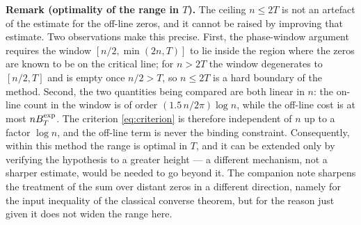 \documentclass[11pt]{article}
\theoremstyle{remark}
\begin{document}
\medskip
\noindent\textbf{Remark (optimality of the range in $T$).}\label{rem:optimal}
The ceiling $n\le 2T$ is not an artefact of the estimate for the off-line zeros, and it cannot be
raised by improving that estimate. Two observations make this precise. First, the phase-window
argument requires the window $[n/2,\min(2n,T)]$ to lie inside the region where the zeros are known
to be on the critical line; for $n>2T$ the window degenerates to $[n/2,T]$ and is empty once
$n/2>T$, so $n\le2T$ is a hard boundary of the method. Second, the two quantities being compared
are both linear in $n$: the on-line count in the window is of order $(1.5\,n/2\pi)\log n$, while the
off-line cost is at most $nB_T^{\rm exp}$. The criterion \eqref{eq:criterion} is therefore
independent of $n$ up to a factor $\log n$, and the off-line term is never the binding
constraint. Consequently, within this method the range is optimal in $T$, and it can be extended
only by verifying the hypothesis to a greater height --- a different mechanism, not a sharper
estimate, would be needed to go beyond it. The companion note \cite{BT26} sharpens the treatment
of the sum over distant zeros in a different direction, namely for the input inequality of the
classical converse theorem, but for the reason just given it does not widen the range here.
\end{document}
